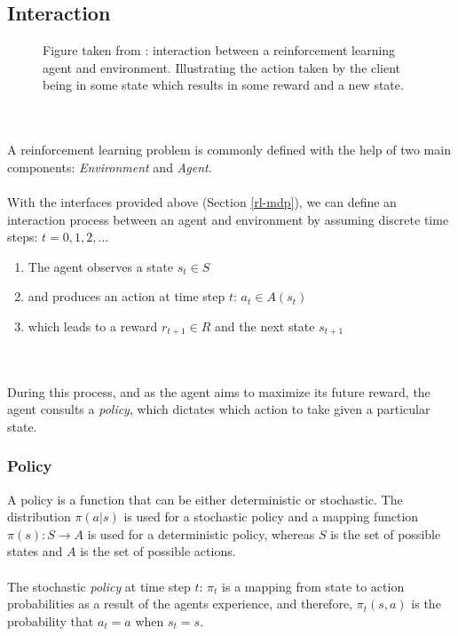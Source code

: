 \subsection{Interaction}

\begin{figure}[H]
    \centering
    \caption{Figure taken from \cite{rl-demystified}: interaction between a reinforcement learning agent and environment. Illustrating the action taken by the client being in some state which results in some reward and a new state.}
    \label{fit:rl-overview}
\end{figure}
\\
\\
A reinforcement learning problem is commonly defined with the help of two main components: \textit{Environment} and \textit{Agent}.
\\
\\
With the interfaces provided above (Section \ref{rl-mdp}), we can define an interaction process between an agent and environment by assuming discrete time steps: $t=0, 1, 2, ...$

\begin{enumerate}
    \item The agent observes a state $s_t \in S$
    \item and produces an action at time step $t$: $a_t \in A(s_t)$
    \item which leads to a reward $r_{t+1} \in R$ and the next state $s_{t+1}$
\end{enumerate}
\\
\\
During this process, and as the agent aims to maximize its future reward, the agent consults a \textit{policy}, which dictates which action to take given a particular state.

\subsubsection{Policy}

A policy is a function that can be either deterministic or stochastic. 
The distribution $\pi(a|s)$ is used for a stochastic policy and a mapping function $\pi(s) : S \rightarrow A$ is used for a deterministic policy, whereas $S$ is the set of possible states and $A$ is the set of possible actions.
\\
\\
The stochastic \textit{policy} at time step $t$: $\pi_t$ is a mapping from state to action probabilities as a result of the agents experience, and therefore, $\pi_t(s, a)$ is the probability that $a_t=a$ when $s_t=s$.

